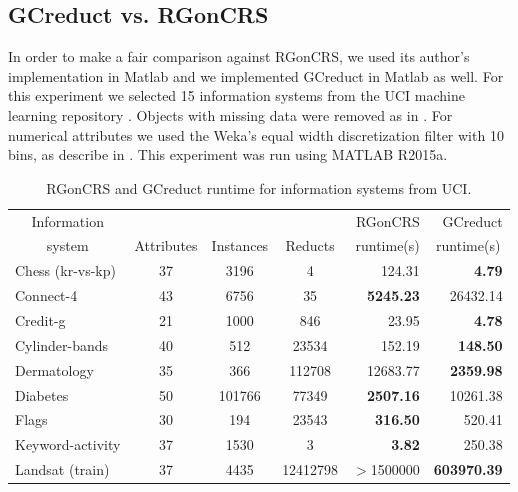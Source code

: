 \documentclass[number,preprint,review,12pt]{elsarticle}
\begin{document}
\subsection{GCreduct vs. RGonCRS}\label{sub:matlab}
	In order to make a fair comparison against RGonCRS, we used its author's implementation in Matlab and we implemented GCreduct in Matlab as well. For this experiment we selected 15 information systems from the UCI machine learning repository \citep{Bache13}. Objects with missing data were removed as in \citep{WangP07}. For numerical attributes we used the Weka's equal width discretization filter with 10 bins, as describe in \cite{Flores2010}. This experiment was run using MATLAB R2015a.
	
	\begin{table}[!htb]
		\caption{RGonCRS and GCreduct runtime for information systems from UCI.}\label{tab:matlab}
		\centering \footnotesize
		\begin{tabular}{|l|c|c|c|r|r|}
			\hline
			\multicolumn{1}{|c|}{Information}&&&& RGonCRS & GCreduct\\ 
			\multicolumn{1}{|c|}{system} & Attributes & Instances & Reducts & runtime(s) & \multicolumn{1}{c|}{runtime(s)}\\ 
			\hline
			Chess (kr-vs-kp)          & 37         & 3196      & 4        & 124.31            & \textbf{4.79}      \\
			Connect-4                 & 43         & 6756      & 35       & \textbf{5245.23}  & 26432.14           \\
			Credit-g                  & 21         & 1000      & 846      & 23.95             & \textbf{4.78}      \\
			Cylinder-bands            & 40         & 512       & 23534    & 152.19            & \textbf{148.50}    \\
			Dermatology               & 35         & 366       & 112708   & 12683.77          & \textbf{2359.98}   \\
			Diabetes                  & 50         & 101766    & 77349    & \textbf{2507.16}  & 10261.38           \\
			Flags                     & 30         & 194       & 23543    & \textbf{316.50}   & 520.41             \\
			Keyword-activity          & 37         & 1530      & 3        & \textbf{3.82}     & 250.38             \\
			Landsat (train)           & 37         & 4435      & 12412798 & $>$1500000        & \textbf{603970.39} \\

\end{tabular}
\end{table}
\end{document}
